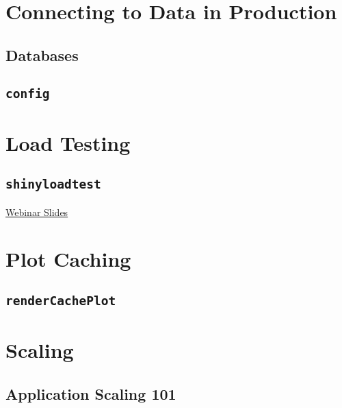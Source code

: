 \documentclass[]{book}
\begin{document}
\hypertarget{connecting-to-data-in-production}{%
\chapter{Connecting to Data in
Production}\label{connecting-to-data-in-production}}

\hypertarget{databases}{%
\section{Databases}\label{databases}}

\hypertarget{config}{%
\section{\texorpdfstring{\texttt{config}}{config}}\label{config}}

\hypertarget{load-testing}{%
\chapter{Load Testing}\label{load-testing}}

\hypertarget{shinyloadtest}{%
\section{\texorpdfstring{\texttt{shinyloadtest}}{shinyloadtest}}\label{shinyloadtest}}

\href{https://github.com/rstudio/webinars/blob/master/63-shinyloadtest/slides.pdf}{Webinar
Slides}

\hypertarget{plot-caching}{%
\chapter{Plot Caching}\label{plot-caching}}

\hypertarget{rendercacheplot}{%
\section{\texorpdfstring{\texttt{renderCachePlot}}{renderCachePlot}}\label{rendercacheplot}}

\hypertarget{scaling}{%
\chapter{Scaling}\label{scaling}}

\hypertarget{application-scaling-101}{%
\section{Application Scaling 101}\label{application-scaling-101}}
\end{document}
